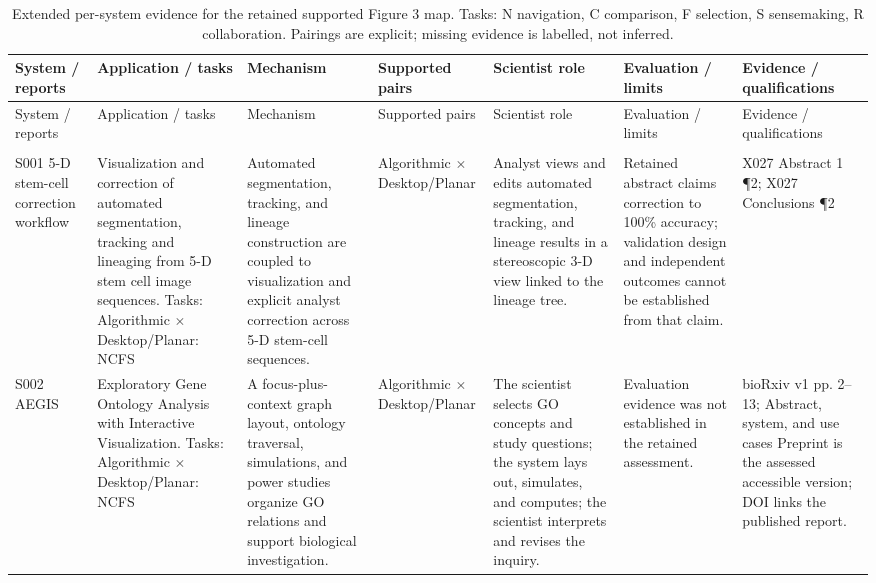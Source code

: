 \begin{landscape}
\begingroup
\footnotesize
\setlength{\tabcolsep}{3pt}
\renewcommand{\arraystretch}{1.12}
\setlength{\LTcapwidth}{\linewidth}
\begin{longtable}{@{}>{\raggedright\arraybackslash}p{.125\linewidth}>{\raggedright\arraybackslash}p{.135\linewidth}>{\raggedright\arraybackslash}p{.145\linewidth}>{\raggedright\arraybackslash}p{.11\linewidth}>{\raggedright\arraybackslash}p{.12\linewidth}>{\raggedright\arraybackslash}p{.14\linewidth}>{\raggedright\arraybackslash}p{.13\linewidth}@{}}
\caption{Extended per-system evidence for the retained supported Figure 3 map. Tasks: N navigation, C comparison, F selection, S sensemaking, R collaboration. Pairings are explicit; missing evidence is labelled, not inferred.}\label{tab:supp-system-evidence}\\
\hline System / reports & Application / tasks & Mechanism & Supported pairs & Scientist role & Evaluation / limits & Evidence / qualifications\\\hline
\endfirsthead
\hline System / reports & Application / tasks & Mechanism & Supported pairs & Scientist role & Evaluation / limits & Evidence / qualifications\\\hline
\endhead
\hline\multicolumn{7}{r}{Continued on next page}\\\endfoot
\hline\endlastfoot
S001 5-D stem-cell correction workflow~\cite{ExpansionX027} & Visualization and correction of automated segmentation, tracking and lineaging from 5-D stem cell image sequences. Tasks: Algorithmic $\times$ Desktop/Planar: NCFS & Automated segmentation, tracking, and lineage construction are coupled to visualization and explicit analyst correction across 5-D stem-cell sequences. & Algorithmic $\times$ Desktop/Planar & Analyst views and edits automated segmentation, tracking, and lineage results in a stereoscopic 3-D view linked to the lineage tree. & Retained abstract claims correction to 100\% accuracy; validation design and independent outcomes cannot be established from that claim. & X027 Abstract 1 \P{}2; X027 Conclusions \P{}2 \\
S002 AEGIS~\cite{SuppAEGIS} & Exploratory Gene Ontology Analysis with Interactive Visualization. Tasks: Algorithmic $\times$ Desktop/Planar: NCFS & A focus-plus-context graph layout, ontology traversal, simulations, and power studies organize GO relations and support biological investigation. & Algorithmic $\times$ Desktop/Planar & The scientist selects GO concepts and study questions; the system lays out, simulates, and computes; the scientist interprets and revises the inquiry. & Evaluation evidence was not established in the retained assessment. & bioRxiv v1 pp. 2–13; Abstract, system, and use cases Preprint is the assessed accessible version; DOI links the published report. \\

\end{longtable}
\end{landscape}

